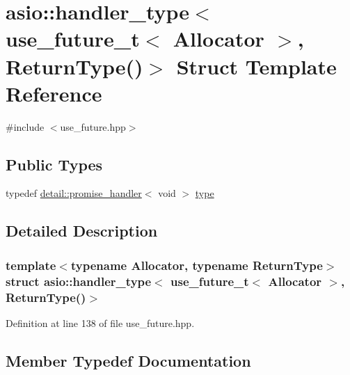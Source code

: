 \hypertarget{structasio_1_1handler__type_3_01use__future__t_3_01_allocator_01_4_00_01_return_type_07_08_4}{}\section{asio\+:\+:handler\+\_\+type$<$ use\+\_\+future\+\_\+t$<$ Allocator $>$, Return\+Type()$>$ Struct Template Reference}
\label{structasio_1_1handler__type_3_01use__future__t_3_01_allocator_01_4_00_01_return_type_07_08_4}


{\ttfamily \#include $<$use\+\_\+future.\+hpp$>$}

\subsection*{Public Types}
\begin{DoxyCompactItemize}
\item 
typedef \hyperlink{classasio_1_1detail_1_1promise__handler}{detail\+::promise\+\_\+handler}$<$ void $>$ \hyperlink{structasio_1_1handler__type_3_01use__future__t_3_01_allocator_01_4_00_01_return_type_07_08_4_a398b4ea023b61d222b8070f86d931240}{type}
\end{DoxyCompactItemize}


\subsection{Detailed Description}
\subsubsection*{template$<$typename Allocator, typename Return\+Type$>$struct asio\+::handler\+\_\+type$<$ use\+\_\+future\+\_\+t$<$ Allocator $>$, Return\+Type()$>$}



Definition at line 138 of file use\+\_\+future.\+hpp.



\subsection{Member Typedef Documentation}
\hypertarget{structasio_1_1handler__type_3_01use__future__t_3_01_allocator_01_4_00_01_return_type_07_08_4_a398b4ea023b61d222b8070f86d931240}{}
